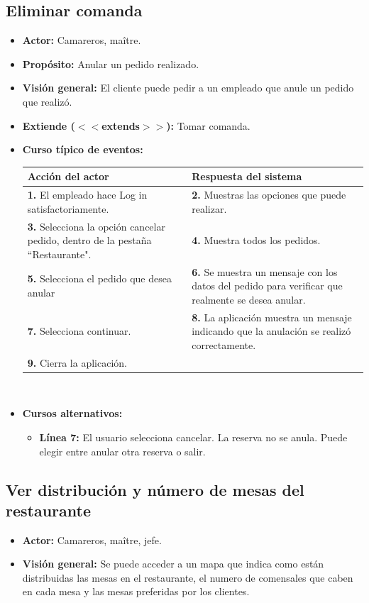 \documentclass[spanish,a4paper,11pt, twoside]{report}	%
\begin{document}

		\subsection{Eliminar comanda}
			\begin{itemize}
			\item \textbf{Actor:} Camareros, maître.
			\item \textbf{Propósito: } Anular un pedido realizado.
			\item \textbf{Visión general:} El cliente puede pedir a un empleado que anule un pedido que realizó.
			\item \textbf{Extiende ($<<$extends$>>$):} Tomar comanda.
			\item \textbf{Curso típico de eventos:} 	\\
				\begin{tabular}{|p{6cm}||p{6cm}|}
				\hline
				\textbf{Acción del actor} & \textbf{Respuesta del sistema} \\ \hline \hline
				\textbf{1.} El empleado hace Log in satisfactoriamente. & \textbf{2.} Muestras las opciones que puede realizar. \\ \hline
				\textbf{3.} Selecciona la opción cancelar pedido, dentro de la pestaña “Restaurante". & \textbf{4.} Muestra todos los pedidos. \\ \hline
				\textbf{5.} Selecciona el pedido que desea anular	& \textbf{6.} Se muestra un mensaje con los datos del pedido para verificar que realmente se desea anular. \\ \hline
				\textbf{7.} Selecciona continuar.	& \textbf{8.} La aplicación muestra un mensaje indicando que la anulación se realizó correctamente. \\ \hline
				\textbf{9.} Cierra la aplicación. &  \\ \hline
			\end{tabular}
			\\
			\item \textbf{Cursos alternativos:} 
			\begin{itemize}
			\item  \textbf{Línea 7:} El usuario selecciona cancelar. La reserva no se anula. Puede elegir entre anular otra reserva o salir.
			\end {itemize}
		\end {itemize}
		


			
		\subsection{Ver distribución y número de mesas del restaurante}
			\begin{itemize}
				\item \textbf{Actor:} Camareros, maître, jefe.
				\item \textbf{Visión general:} Se puede acceder a un mapa que indica como están distribuidas las mesas en el restaurante, el numero de comensales que caben en cada mesa y las mesas preferidas por los clientes.
			\end {itemize}
\end{document}
